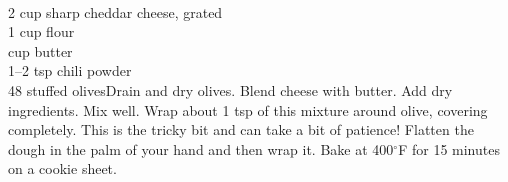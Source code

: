 \begin{minipage}{\linewidth}
\end{minipage}\par\begin{minipage}{\linewidth} 
 \\
\step
{2 cup sharp cheddar cheese, grated \\
 1 cup flour \\
  cup butter \\
 1--2 tsp chili powder \\
 48 stuffed olives}{Drain and dry olives. Blend cheese with butter. Add dry ingredients. Mix well. Wrap about 1 tsp of this mixture around olive, covering completely. This is the tricky bit and can take a bit of patience! Flatten the dough in the palm of your hand and then wrap it. Bake at 400$^\circ$F for 15 minutes on a cookie sheet.}


		

\end{minipage}
